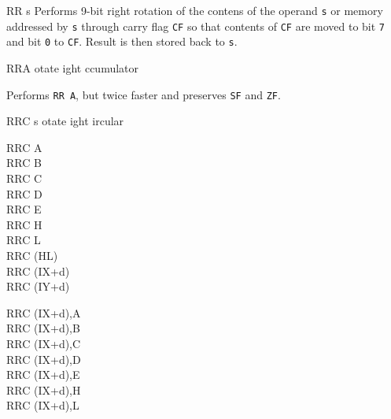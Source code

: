 \begin{basedescript}{
	\desclabelstyle{\multilinelabel}
	\desclabelwidth{3cm}}
\begin{DetailItem}{RR s}
		Performs 9-bit right rotation of the contens of the operand {\tt s} or memory addressed by {\tt s} through carry flag {\tt CF} so that contents of {\tt CF} are moved to bit {\tt 7} and bit {\tt 0} to {\tt CF}. Result is then stored back to {\tt s}.

		\begin{DetailEffects}[p]
			\FlagsRRr
		\end{DetailEffects}
						
		\begin{DetailTiming}
		\end{DetailTiming}

	\end{DetailItem}

	\begin{DetailItem}{RRA}
		{otate ight ccumulator}
		{\SymRR{A}}

		Performs {\tt RR A}, but twice faster and preserves {\tt SF} and {\tt ZF}.

		\begin{DetailEffects}
			\FlagsRRA
		\end{DetailEffects}
						
		\begin{DetailTiming}
			\DetailTime{1}{4}
		\end{DetailTiming}

	\end{DetailItem}

	\pagebreak
	\begin{DetailItem}{RRC s}
		{otate ight ircular}
		{\SymRRC{s}}

		\begin{DetailVariants}
			RRC A\\
			RRC B\\
			RRC C\\
			RRC D\\
			RRC E\\
			RRC H\\
			RRC L\\
			RRC (HL)\\
			RRC (IX+d)\\
			RRC (IY+d)

			\columnbreak
			RRC (IX+d),A\UNDOC\\
			RRC (IX+d),B\UNDOC\\
			RRC (IX+d),C\UNDOC\\
			RRC (IX+d),D\UNDOC\\
			RRC (IX+d),E\UNDOC\\
			RRC (IX+d),H\UNDOC\\
			RRC (IX+d),L\UNDOC


\end{DetailVariants}
\end{DetailItem}
\end{basedescript}
